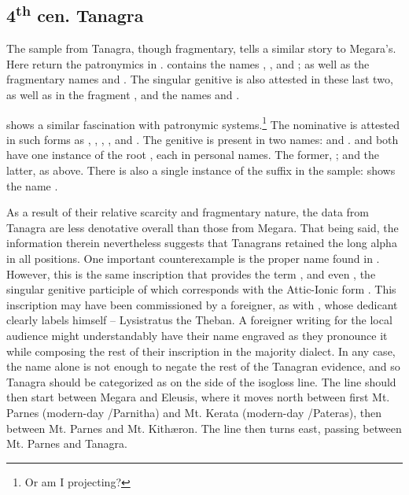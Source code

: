 \subsection{4\textsuperscript{th} cen.  Tanagra}
The sample from Tanagra, 
though fragmentary,
tells a similar story to Megara's.
Here return the patronymics in .
 contains the names ,
,
and ;
as well as the fragmentary names  and .
The singular genitive  is also attested in these last two,
as well as in the fragment ,
and the names  and .

 shows a similar fascination with patronymic systems.\footnote{Or am I projecting?}
The nominative is attested in such forms as ,
,
,
,
and .
The genitive is present in two names:  and . 
 and  both have one instance of the root , each in personal names.
The former, 
; and the latter, 
 as above.
There is also a single instance of the suffix  in the sample:
 shows the name .

As a result of their relative scarcity and fragmentary nature,
the data from Tanagra are less denotative overall than those from Megara.
That being said, the information therein nevertheless suggests that Tanagrans retained the long alpha in all positions.
One important counterexample is the proper name  found in .
However,
this is the same inscription that provides the term ,
and even ,
the singular genitive participle of 
which corresponds with the Attic-Ionic form .
This inscription may have been commissioned by a foreigner,
as with ,
whose dedicant clearly labels himself  --
Lysistratus the Theban.
A foreigner writing for the local audience might understandably have their name engraved as they pronounce it
while composing the rest of their inscription in the majority dialect.
In any case, 
the name alone is not enough to negate the rest of the Tanagran evidence,
and so Tanagra should be categorized as on the  side of the isogloss line.
The line should then start between Megara and Eleusis,
where it moves north between first Mt. Parnes (modern-day /Parnitha)
and Mt. Kerata (modern-day /Pateras),
then between Mt. Parnes and Mt. Kithæron.
The line then turns east, passing between Mt. Parnes and Tanagra.

